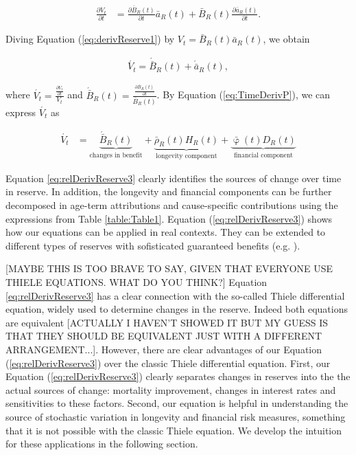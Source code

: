 \documentclass[12pt]{article}
\begin{document}
\begin{equation}\label{eq:derivReserve1}
	\begin{split}
	\frac{\partial V_t}{\partial t}&=\frac{\partial \bar{B}_R(t)}{\partial t}\bar{a}_R(t)+\bar{B}_R(t)\frac{\partial\bar{a}_R(t)}{\partial t}.
	\end{split}
\end{equation}

Diving Equation (\ref{eq:derivReserve1})  by $V_t= \bar{B}_R(t) \bar{a}_R(t)$, we obtain
 
 \begin{equation}\label{eq:relDerivReserve2}
 	\begin{split}
\acute{V_t}=\acute{\bar{B}}_R(t)+\acute{\bar{a}}_R(t),
 	\end{split}
 \end{equation}

where $\acute{V_t}=\frac{\frac{\partial V_t}{\partial t}}{V_t}$ and $\acute{\bar{B}}_R(t)=\frac{\frac{\partial \bar{B}_R(t)}{\partial t}}{\bar{B}_R(t)}$. By Equation (\ref{eq:TimeDerivP}), we can express $\acute{V_t}$ as

 \begin{equation}\label{eq:relDerivReserve3}
	\begin{split}
		\acute{V_t}	&=\underbrace{\acute{\bar{B}}_R(t)}_\text{changes in benefit}+
		\underbrace{\bar{\rho}_R(t){H}_R(t)}_\text{longevity component}
		+\underbrace{\bar{\upvarphi}(t){D}_R(t)}_\text{financial component}		
	\end{split}
\end{equation}


Equation \ref{eq:relDerivReserve3} clearly identifies the sources of change over time in reserve. In addition, the longevity and financial components can be further decomposed in age-term attributions and cause-specific contributions using the expressions from Table \ref{table:Table1}. Equation (\ref{eq:relDerivReserve3}) shows how our equations can be applied in real contexts. They can be extended to different types of reserves with sofisticated guaranteed benefits (e.g. \citep{jarner2017long}).

[MAYBE THIS IS TOO BRAVE TO SAY, GIVEN THAT EVERYONE USE THIELE EQUATIONS. WHAT DO YOU THINK?]
Equation \ref{eq:relDerivReserve3} has a clear connection with the so-called Thiele differential equation, widely used to determine changes in the reserve. Indeed both equations are equivalent [ACTUALLY I HAVEN'T SHOWED IT BUT MY GUESS IS THAT THEY SHOULD BE EQUIVALENT JUST WITH A DIFFERENT ARRANGEMENT...]. However, there are clear advantages of our Equation (\ref{eq:relDerivReserve3})  over the classic Thiele differential equation. First, our Equation (\ref{eq:relDerivReserve3}) clearly separates changes in reserves into the the actual sources of change: mortality improvement, changes in interest rates and sensitivities to these factors. Second, our equation is helpful in understanding the source of stochastic variation in longevity and financial risk measures, something that it is not possible with the classic Thiele equation. We develop the intuition for these applications in the following section.
\end{document}
